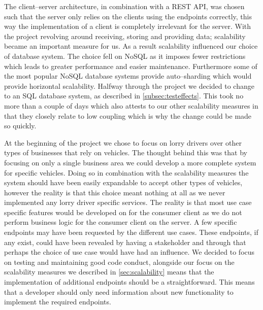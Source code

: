 \bigskip
The client--server architecture, in combination with a REST API, was chosen such that the server only relies on the clients using the endpoints correctly, this way the implementation of a client is completely irrelevant for the server.
With the project revolving around receiving, storing and providing data; scalability became an important measure for us.
As a result scalability influenced our choice of database system.
The choice fell on NoSQL as it imposes fewer restrictions which leads to greater performance and easier maintenance.
Furthermore some of the most popular NoSQL database systems provide auto--sharding which would provide horizontal scalability.
Halfway through the project we decided to change to an SQL database system, as described in \cref{subsec:testeffects}.
This took no more than a couple of days which also attests to our other scalability measures in that they closely relate to low coupling which is why the change could be made so quickly.

At the beginning of the project we chose to focus on lorry drivers over other types of businesses that rely on vehicles.
The thought behind this was that by focusing on only a single business area we could develop a more complete system for specific vehicles.
Doing so in combination with the scalability measures the system should have been easily expandable to accept other types of vehicles, however the reality is that this choice meant nothing at all as we never implemented any lorry driver specific services.
The reality is that most use case specific features would be developed on for the consumer client as we do not perform business logic for the consumer client on the server.
A few specific endpoints may have been requested by the different use cases.
These endpoints, if any exist, could have been revealed by having a stakeholder and through that perhaps the choice of use case would have had an influence.
We decided to focus on testing and maintaining good code conduct, alongside our focus on the scalability measures we described in \cref{sec:scalability} means that the implementation of additional endpoints should be a straightforward.%
This means that a developer should only need information about new functionality to implement the required endpoints.

